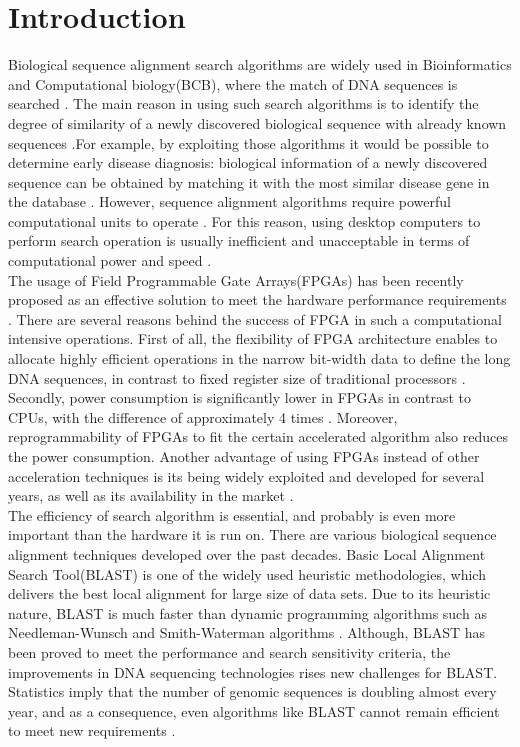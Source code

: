 \section{Introduction}
\label{sec:introduction}

\quad Biological sequence alignment search algorithms are widely used in Bioinformatics and Computational biology(BCB), where the match of DNA sequences is searched \cite{kasap2008design}. The main reason in using such search algorithms is to identify the degree of similarity of a newly discovered biological sequence with already known sequences \cite{kasap2008design}.For example, by exploiting those algorithms it would be possible to determine early disease diagnosis: biological information of a newly discovered sequence can be obtained by matching it with the most similar disease gene in the database \cite{guo2012systolic}. However, sequence alignment algorithms require powerful computational units to operate \cite{datta2009}. For this reason, using desktop computers to perform search operation is usually inefficient and unacceptable in terms of computational power and speed \cite{masato2016}.  
\\

The usage of Field Programmable Gate Arrays(FPGAs) has been recently proposed as an effective solution to meet the hardware performance requirements \cite{kasap2008design}. There are several reasons behind the success of FPGA in such a computational intensive operations. First of all, the flexibility of FPGA architecture enables to allocate highly efficient operations in the narrow bit-width data to define the long DNA sequences, in contrast to fixed register size of traditional processors \cite{cug2007}. Secondly, power consumption is significantly lower in FPGAs in contrast to CPUs, with the difference of approximately 4 times \cite{cug2007}. Moreover, reprogrammability of FPGAs to fit the certain accelerated algorithm also reduces the power consumption. Another advantage of using FPGAs instead of other acceleration techniques is its being widely exploited and developed for several years, as well as its availability in the market \cite{cug2007}. 
\\

The efficiency of search algorithm is essential, and probably is even more important than the hardware it is run on. There are various biological sequence alignment techniques developed over the past decades\cite{mohd2013}. Basic Local Alignment Search Tool(BLAST) is one of the widely used heuristic methodologies, which delivers the best local alignment for large size of data sets. Due to its heuristic nature, BLAST is much faster than dynamic programming algorithms such as Needleman-Wunsch and Smith-Waterman algorithms \cite{wien2011blastp}. Although, BLAST has been proved to meet the performance and search sensitivity criteria, the improvements in DNA sequencing technologies rises new challenges for BLAST. Statistics imply that the number of genomic sequences is doubling almost every year, and as a consequence, even algorithms like BLAST cannot remain efficient to meet new requirements \cite{wien2011blastp}. 
\\

